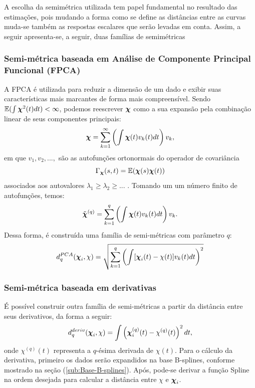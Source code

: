 \documentclass[
	12pt,				%
	openright,			%
	oneside,			%
	a4paper,			%
	english,			%
	brazil				%
	]{dissertacao-ufrgs-abntex2}
\begin{document}
A escolha da semimétrica utilizada tem papel fundamental no resultado das estimações, pois mudando a forma como se define as distâncias entre as curvas muda-se também as respostas escalares que serão levadas em conta. Assim, a seguir apresenta-se, a seguir, duas famílias de semimétricas

\subsubsection*{Semi-métrica baseada em Análise de Componente Principal Funcional
(FPCA)}

A FPCA é utilizada para reduzir a dimensão de um dado e exibir suas
características mais marcantes de forma mais compreensível. Sendo
$\mathbb{E}(\int\boldsymbol{\chi}^{2}(t)dt)<\infty$, podemos reescrever $\boldsymbol{\chi}$
como a sua expansão pela combinação linear de seus componentes principais:
\begin{equation}
\boldsymbol{\chi}=\sum_{k=1}^{\text{\ensuremath{\infty}}}\left(\int\boldsymbol{\chi}(t)v_{k}(t)dt\right)v_{k},
\end{equation}
em que $v_{1},v_{2},...,$ são as autofunções ortonormais do operador de covariância
\begin{equation}
\Gamma_{\boldsymbol{\chi}}(s,t)=\mathbb{E}(\boldsymbol{\chi}(s)\boldsymbol{\chi}(t))
\end{equation}
associados aos autovalores $\lambda_{1}\geq\lambda_{2}\geq...$ .
Tomando um um número finito de autofunções, temos:
\begin{equation}
\tilde{\boldsymbol{\chi}}^{(q)}=\sum_{k=1}^{\text{\ensuremath{q}}}\left(\int\boldsymbol{\chi}(t)v_{k}(t)dt\right)v_{k}.
\end{equation}
Dessa forma, é construída uma família de semi-métricas com parâmetro
$q$:
\begin{equation}
d_{q}^{PCA}(\boldsymbol{\chi}_{i},\chi)=\sqrt{\sum_{k=1}^{\text{\ensuremath{q}}}\left(\int[\boldsymbol{\chi}_{i}(t)-\chi(t)]v_{k}(t)dt\right)^{2}}
\end{equation}



\subsubsection*{Semi-métrica baseada em derivativas}

É possível construir outra família de semi-métricas a partir da distância
entre seus derivativos, da forma a seguir:
\begin{equation}
d_{q}^{deriv}(\boldsymbol{\chi}_{i},\chi)=\int\left(\boldsymbol{\chi}_{i}^{(q)}(t)-\chi^{(q)}(t)\right)^{2}dt,
\end{equation}
onde $\chi^{(q)}(t)$ representa a $q$-ésima derivada de $\chi(t)$.
Para o cálculo da derivativa, primeiro os dados serão expandidos na
base B-splines, conforme mostrado na seção (\ref{sub:Base-B-splines}).
Após, pode-se derivar a função Spline na ordem desejada para calcular
a distância entre $\chi$ e $\boldsymbol{\chi}_{i}$.
\end{document}
